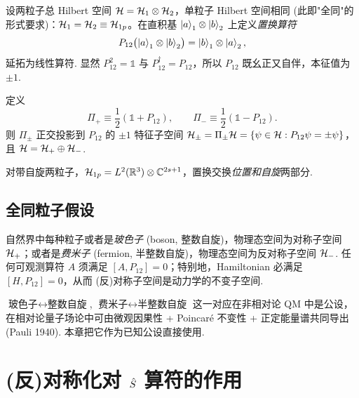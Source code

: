 设两粒子总 Hilbert 空间 $\mathcal{H}=\mathcal{H}_1\otimes\mathcal{H}_2$，单粒子 Hilbert 空间相同 (此即"全同"的形式要求)：$\mathcal{H}_1=\mathcal{H}_2\equiv\mathcal{H}_{1p}$。在直积基 $\ket{a}_1\otimes\ket{b}_2$ 上定义\emph{置换算符}
\begin{equation}
  P_{12}\bigl(\ket{a}_1\otimes\ket{b}_2\bigr)=\ket{b}_1\otimes\ket{a}_2,
  \label{eq:id-P12-def}
\end{equation}
延拓为线性算符. 显然 $P_{12}^2=\mathbb 1$ 与 $P_{12}^\dagger=P_{12}$，所以 $P_{12}$ 既幺正又自伴，本征值为 $\pm 1$.

\begin{definition}[对称/反对称投影]\label{def:id-Pi}
  定义
  \begin{equation}
    \Pi_+\equiv\frac{1}{2}(\mathbb 1+P_{12}),\qquad
    \Pi_-\equiv\frac{1}{2}(\mathbb 1-P_{12}).
    \label{eq:id-Pi-def}
  \end{equation}
  则 $\Pi_\pm$ 正交投影到 $P_{12}$ 的 $\pm 1$ 特征子空间
  $\mathcal{H}_\pm=\Pi_\pm\mathcal{H}=\{\psi\in\mathcal{H}:P_{12}\psi=\pm\psi\}$，
  且 $\mathcal{H}=\mathcal{H}_+\oplus\mathcal{H}_-$.
\end{definition}

对带自旋两粒子，$\mathcal{H}_{1p}=L^2(\mathbb{R}^3)\otimes\mathbb{C}^{2s+1}$，置换交换\emph{位置和自旋}两部分.

\subsection{全同粒子假设}\label{sec:id-postulate}

\begin{definition}[全同粒子假设]\label{def:id-axiom}
  自然界中每种粒子或者是\emph{玻色子} (boson, 整数自旋)，物理态空间为对称子空间 $\mathcal{H}_+$；或者是\emph{费米子} (fermion, 半整数自旋)，物理态空间为反对称子空间 $\mathcal{H}_-$. 任何可观测算符 $A$ 须满足 $[A,P_{12}]=0$；特别地，Hamiltonian 必满足 $[H,P_{12}]=0$，从而 (反)对称子空间是动力学的不变子空间.
\end{definition}

\begin{remark}[自旋--统计定理]
  $\text{玻色子}\leftrightarrow\text{整数自旋}$, $\text{费米子}\leftrightarrow\text{半整数自旋}$ 这一对应在非相对论 QM 中是公设，在相对论量子场论中可由微观因果性 + Poincaré 不变性 + 正定能量谱共同导出 (Pauli 1940). 本章把它作为已知公设直接使用.
\end{remark}

\section{(反)对称化对 \texorpdfstring{$\hat{S}$}{S} 算符的作用}\label{sec:id-Smat}

